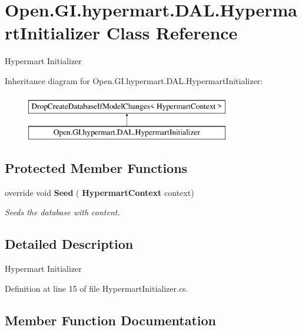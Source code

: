 \section{Open.\+G\+I.\+hypermart.\+D\+A\+L.\+Hypermart\+Initializer Class Reference}
\label{class_open_1_1_g_i_1_1hypermart_1_1_d_a_l_1_1_hypermart_initializer}


Hypermart Initializer  


Inheritance diagram for Open.\+G\+I.\+hypermart.\+D\+A\+L.\+Hypermart\+Initializer\+:\begin{figure}[H]
\begin{center}
\leavevmode
\includegraphics[height=2.000000cm]{class_open_1_1_g_i_1_1hypermart_1_1_d_a_l_1_1_hypermart_initializer}
\end{center}
\end{figure}
\subsection*{Protected Member Functions}
\begin{DoxyCompactItemize}
\item 
override void \textbf{ Seed} (\textbf{ Hypermart\+Context} context)
\begin{DoxyCompactList}\small\item\em Seeds the database with content. \end{DoxyCompactList}\end{DoxyCompactItemize}


\subsection{Detailed Description}
Hypermart Initializer 



Definition at line 15 of file Hypermart\+Initializer.\+cs.



\subsection{Member Function Documentation}
\mbox{\label{class_open_1_1_g_i_1_1hypermart_1_1_d_a_l_1_1_hypermart_initializer_a2e19732fa6f8db0a6b72049415947016}} 

